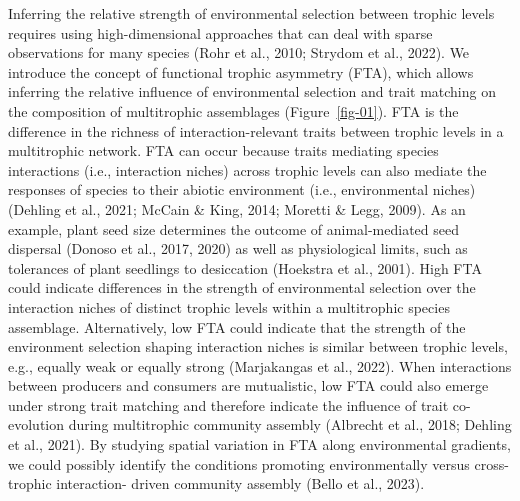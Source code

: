 \documentclass[
]{agujournal2019}
\begin{document}
Inferring the relative strength of environmental selection between
trophic levels requires using high-dimensional approaches that can deal
with sparse observations for many species (Rohr et al., 2010; Strydom et
al., 2022). We introduce the concept of functional trophic asymmetry
(FTA), which allows inferring the relative influence of environmental
selection and trait matching on the composition of multitrophic
assemblages (Figure~\ref{fig-01}). FTA is the difference in the richness
of interaction-relevant traits between trophic levels in a multitrophic
network. FTA can occur because traits mediating species interactions
(i.e., interaction niches) across trophic levels can also mediate the
responses of species to their abiotic environment (i.e., environmental
niches) (Dehling et al., 2021; McCain \& King, 2014; Moretti \& Legg,
2009). As an example, plant seed size determines the outcome of
animal-mediated seed dispersal (Donoso et al., 2017, 2020) as well as
physiological limits, such as tolerances of plant seedlings to
desiccation (Hoekstra et al., 2001). High FTA could indicate differences
in the strength of environmental selection over the interaction niches
of distinct trophic levels within a multitrophic species assemblage.
Alternatively, low FTA could indicate that the strength of the
environment selection shaping interaction niches is similar between
trophic levels, e.g., equally weak or equally strong (Marjakangas et
al., 2022). When interactions between producers and consumers are
mutualistic, low FTA could also emerge under strong trait matching and
therefore indicate the influence of trait co-evolution during
multitrophic community assembly (Albrecht et al., 2018; Dehling et al.,
2021). By studying spatial variation in FTA along environmental
gradients, we could possibly identify the conditions promoting
environmentally versus cross-trophic interaction- driven community
assembly (Bello et al., 2023).
\end{document}
